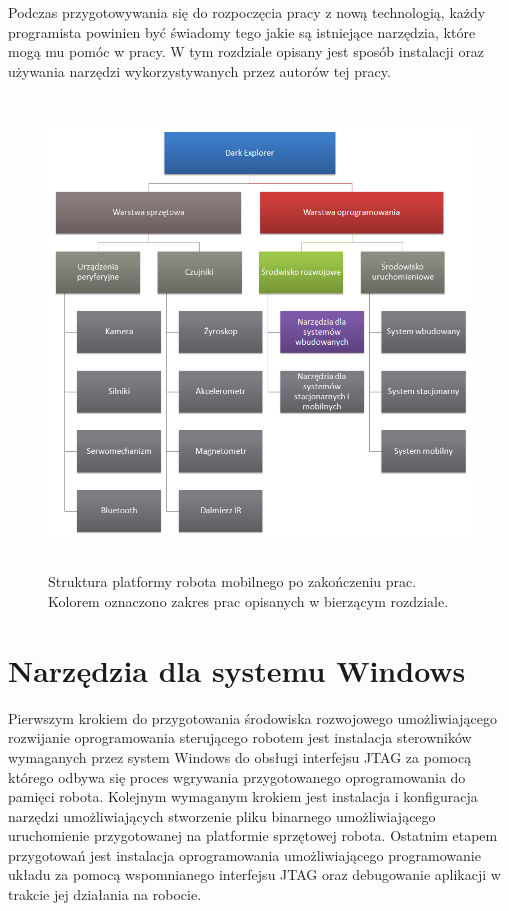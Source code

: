 Podczas przygotowywania się do rozpoczęcia pracy z nową technologią, każdy
programista powinien być świadomy tego jakie są istniejące narzędzia, które mogą
mu pomóc w pracy. W tym rozdziale opisany jest sposób instalacji oraz używania
narzędzi wykorzystywanych przez autorów tej pracy.

\begin{figure}[!ht]
 \centering
 \includegraphics[height=125mm]{../images/ch03/dark_explorer_platform_ide_embeded.png}
 \caption{Struktura platformy robota mobilnego po zakończeniu prac. Kolorem oznaczono zakres prac opisanych w bierzącym rozdziale.}
 \label{fig:DarkExplorerPlatformIDE}
\end{figure}

\section{Narzędzia dla systemu Windows}
\label{sec:embeded-win-tools}
Pierwszym krokiem do przygotowania środowiska rozwojowego umożliwiającego
rozwijanie oprogramowania sterującego robotem jest instalacja sterowników
wymaganych przez system Windows do obsługi interfejsu JTAG za pomocą którego
odbywa się proces wgrywania przygotowanego oprogramowania do pamięci robota.
Kolejnym wymaganym krokiem jest instalacja i konfiguracja narzędzi
umożliwiających stworzenie pliku binarnego umożliwiającego uruchomienie
przygotowanej na platformie sprzętowej robota. Ostatnim etapem przygotowań jest
instalacja oprogramowania umożliwiającego programowanie układu za pomocą
wspomnianego interfejsu JTAG oraz debugowanie aplikacji w trakcie jej działania
na robocie.

